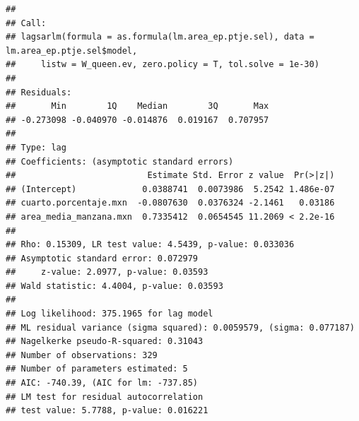 \documentclass[12pt,]{book}
\newenvironment{Shaded}{\begin{snugshade}}{\end{snugshade}}
\newcommand{\KeywordTok}[1]{\textcolor[rgb]{0.13,0.29,0.53}{\textbf{#1}}}
\newcommand{\DataTypeTok}[1]{\textcolor[rgb]{0.13,0.29,0.53}{#1}}
\newcommand{\FloatTok}[1]{\textcolor[rgb]{0.00,0.00,0.81}{#1}}
\newcommand{\CommentTok}[1]{\textcolor[rgb]{0.56,0.35,0.01}{\textit{#1}}}
\newcommand{\OperatorTok}[1]{\textcolor[rgb]{0.81,0.36,0.00}{\textbf{#1}}}
\newcommand{\NormalTok}[1]{#1}
\begin{document}
\begin{Shaded}
\end{Shaded}

\begin{verbatim}
## 
## Call:
## lagsarlm(formula = as.formula(lm.area_ep.ptje.sel), data = lm.area_ep.ptje.sel$model, 
##     listw = W_queen.ev, zero.policy = T, tol.solve = 1e-30)
## 
## Residuals:
##       Min        1Q    Median        3Q       Max 
## -0.273098 -0.040970 -0.014876  0.019167  0.707957 
## 
## Type: lag 
## Coefficients: (asymptotic standard errors) 
##                          Estimate Std. Error z value  Pr(>|z|)
## (Intercept)             0.0388741  0.0073986  5.2542 1.486e-07
## cuarto.porcentaje.mxn  -0.0807630  0.0376324 -2.1461   0.03186
## area_media_manzana.mxn  0.7335412  0.0654545 11.2069 < 2.2e-16
## 
## Rho: 0.15309, LR test value: 4.5439, p-value: 0.033036
## Asymptotic standard error: 0.072979
##     z-value: 2.0977, p-value: 0.03593
## Wald statistic: 4.4004, p-value: 0.03593
## 
## Log likelihood: 375.1965 for lag model
## ML residual variance (sigma squared): 0.0059579, (sigma: 0.077187)
## Nagelkerke pseudo-R-squared: 0.31043 
## Number of observations: 329 
## Number of parameters estimated: 5 
## AIC: -740.39, (AIC for lm: -737.85)
## LM test for residual autocorrelation
## test value: 5.7788, p-value: 0.016221
\end{verbatim}

\begin{Shaded}
\end{Shaded}
\end{document}
